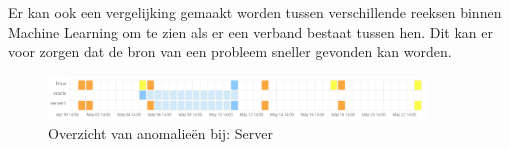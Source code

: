 Er kan ook een vergelijking gemaakt worden tussen verschillende reeksen binnen Machine Learning om te zien als er een verband bestaat tussen hen. 
Dit kan er voor zorgen dat de bron van een probleem sneller gevonden kan worden.
\begin{figure}[h]
	\includegraphics[width=10cm]{img/machinelearning2}
	\caption{Overzicht van anomalieën bij: Server}
	\label{fig:machinelearning2}
\end{figure}